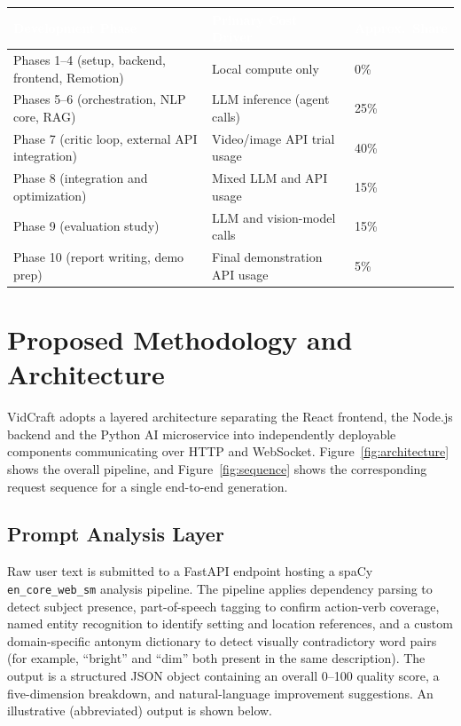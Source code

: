 \documentclass[11pt,a4paper]{article}
\newcommand{\tblhead}[1]{\cellcolor{headerblue}\textcolor{white}{\textbf{#1}}}
\begin{document}
\begin{center}
\begin{tabular}{|p{6cm}|p{4cm}|p{3.3cm}|}
\hline
\tblhead{Development Phase} & \tblhead{Primary Cost Driver} & \tblhead{Approx.\ Share} \\
\hline
Phases 1--4 (setup, backend, frontend, Remotion) & Local compute only & 0\% \\
\hline
Phases 5--6 (orchestration, NLP core, RAG) & LLM inference (agent calls) & 25\% \\
\hline
Phase 7 (critic loop, external API integration) & Video/image API trial usage & 40\% \\
\hline
Phase 8 (integration and optimization) & Mixed LLM and API usage & 15\% \\
\hline
Phase 9 (evaluation study) & LLM and vision-model calls & 15\% \\
\hline
Phase 10 (report writing, demo prep) & Final demonstration API usage & 5\% \\
\hline
\end{tabular}
\label{tab:phasecost}
\end{center}

\needspace{0.5\textheight}
\section{Proposed Methodology and Architecture}

VidCraft adopts a layered architecture separating the React frontend, the Node.js backend and the Python AI microservice into independently deployable components communicating over HTTP and WebSocket. Figure~\ref{fig:architecture} shows the overall pipeline, and Figure~\ref{fig:sequence} shows the corresponding request sequence for a single end-to-end generation.

\subsection{Prompt Analysis Layer}

Raw user text is submitted to a FastAPI endpoint hosting a spaCy \texttt{en\_core\_web\_sm} analysis pipeline. The pipeline applies dependency parsing to detect subject presence, part-of-speech tagging to confirm action-verb coverage, named entity recognition to identify setting and location references, and a custom domain-specific antonym dictionary to detect visually contradictory word pairs (for example, ``bright'' and ``dim'' both present in the same description). The output is a structured JSON object containing an overall 0--100 quality score, a five-dimension breakdown, and natural-language improvement suggestions. An illustrative (abbreviated) output is shown below.
\end{document}
